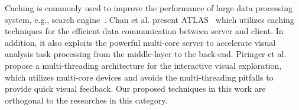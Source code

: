 Caching is commonly used to improve the performance of large data processing system, e.g., search engine~\cite{xu2015diversified}.
Chan et al. present ATLAS~\cite{chan2008maintaining} which utilizes caching techniques for the efficient data communication between server and client.
In addition, it also exploits the powerful multi-core server to accelerate visual analysis task processing from the middle-layer to the back-end.
Piringer et al.~\cite{piringer2009multi} propose a multi-threading architecture for the interactive visual exploration,
which utilizes multi-core devices and avoids the multi-threading pitfalls to provide quick visual feedback.
{Our} proposed techniques in this work are orthogonal to the researches in this category.



